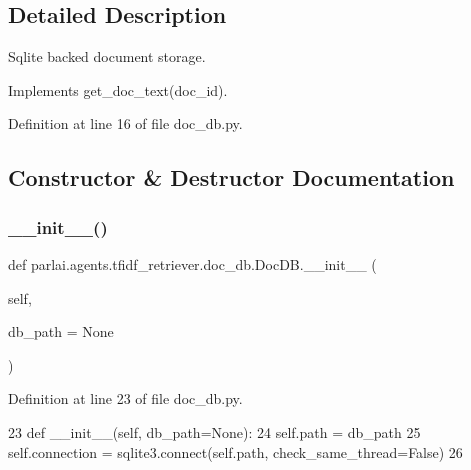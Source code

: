 \subsection{Detailed Description}
\begin{DoxyVerb}Sqlite backed document storage.

Implements get_doc_text(doc_id).
\end{DoxyVerb}
 

Definition at line 16 of file doc\+\_\+db.\+py.



\subsection{Constructor \& Destructor Documentation}
\mbox{\label{classparlai_1_1agents_1_1tfidf__retriever_1_1doc__db_1_1DocDB_adfe0fe6cbf4503d95c40a0f5e61a623c}} 
\subsubsection{\texorpdfstring{\+\_\+\+\_\+init\+\_\+\+\_\+()}{\_\_init\_\_()}}
{\footnotesize\ttfamily def parlai.\+agents.\+tfidf\+\_\+retriever.\+doc\+\_\+db.\+Doc\+D\+B.\+\_\+\+\_\+init\+\_\+\+\_\+ (\begin{DoxyParamCaption}\item[{}]{self,  }\item[{}]{db\+\_\+path = {\ttfamily None} }\end{DoxyParamCaption})}



Definition at line 23 of file doc\+\_\+db.\+py.


\begin{DoxyCode}
23     \textcolor{keyword}{def }\_\_init\_\_(self, db\_path=None):
24         self.path = db\_path
25         self.connection = sqlite3.connect(self.path, check\_same\_thread=\textcolor{keyword}{False})
26 
\end{DoxyCode}



